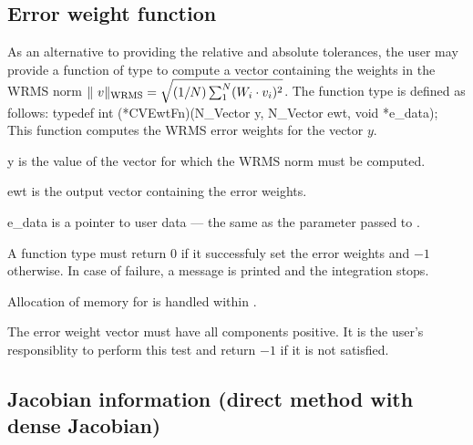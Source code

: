 \subsection{Error weight function}
\label{ss:ewtsetFn}
As an alternative to providing the relative and absolute tolerances, the user may
provide a function of type  to compute a vector  containing the
weights in the WRMS norm 
$\|\ v \|_{\mbox{\scriptsize WRMS}} = \sqrt{(1/N)\sum_1^N (W_i \cdot v_i)^2}$.
The function type  is defined as follows:
{
  typedef int (*CVEwtFn)(N\_Vector y, N\_Vector ewt, void *e\_data);
}
{
  This function computes the WRMS error weights for the vector $y$.
}
{
  \begin{args}[e\_data]
  \item[y]
    is the value of the vector for which the WRMS norm must be computed.
  \item[ewt]
    is the output vector containing the error weights.
  \item[e\_data]
    is a pointer to user data --- the same as the       
    parameter passed to .   
  \end{args}
}
{
  A  function type must return $0$ if it successfuly set
  the error weights and $-1$ otherwise. In case of failure, a message is printed
  and the integration stops.
}
{
  Allocation of memory for  is handled within {\cvode}.

  {\warn} The error weight vector must have all components positive. It is the
  user's responsiblity to perform this test and return $-1$ if it is not 
  satisfied.
}


\subsection{Jacobian information (direct method with dense Jacobian)}
\label{ss:djacFn}

